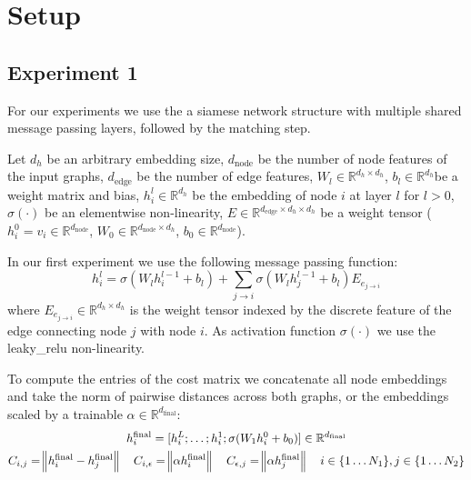 \section{Setup}


\subsection{Experiment 1}

For our experiments we use the a siamese network structure with multiple shared message passing layers, followed by the matching step.


Let $d_h$ be an arbitrary embedding size, $d_{\text{node}}$ be the number of node features of the input graphs, $d_{\text{edge}}$ be the number of edge features, $W_l \in \mathbb{R}^{d_h \times d_h}$, $b_l \in   \mathbb{R}^{d_h}$be a weight matrix and bias, $h_i^l \in \mathbb{R}^{d_h}$ be the embedding of node $i$ at layer $l$ for $l > 0$, $\sigma(\cdot)$ be an elementwise non-linearity, $E \in \mathbb{R}^{d_{\text{edge}} \times d_h \times d_h}$ be a weight tensor ($h_i^0 = v_i \in \mathbb{R}^{d_{\text{node}}}$, $W_0 \in \mathbb{R}^{d_{\text{node}} \times d_h}$, $b_0 \in \mathbb{R}^{d_{\text{node}}}$).

In our first experiment we use the following message passing function:
\begin{equation}
     h_i^{l} = \sigma(W_{l} h_i^{l-1} + b_l) + \sum_{j \rightarrow i} \sigma(W_{l} h_j^{l-1} + b_l) E_{e_{j \rightarrow i}}
\end{equation}
where $E_{e_{j \rightarrow i}} \in \mathbb{R}^{d_h \times d_h}$ is the weight tensor indexed by the discrete feature of the edge connecting node $j$ with node $i$. As activation function $\sigma(\cdot)$ we use the leaky\_relu non-linearity.

To compute the entries of the cost matrix we concatenate all node embeddings and take the norm of pairwise distances across both graphs, or the embeddings scaled by a trainable $\alpha \in \mathbb{R}^{d_\text{final}}$:
\begin{equation}
     \begin{gathered}
          h_i^\text{final} = [h_i^L ; \dots ; h_i^1 ; \sigma(W_{1} h_i^{0} + b_0)] \in \mathbb{R}^{d_\text{final}}\\
          C_{i,j} = \norm{h_i^\text{final} - h_j^\text{final}} \quad
          C_{i, \epsilon} = \norm{ \alpha h_i^\text{final}} \quad
          C_{\epsilon, j} = \norm{ \alpha h_j^\text{final}} \quad i \in \{1 \dots N_1\}, j \in \{1 \dots N_2\}
     \end{gathered}
\end{equation}

